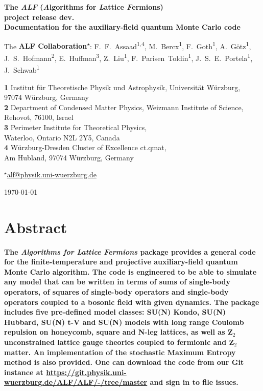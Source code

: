 \documentclass[submission, PhysCodeb]{SciPost}
\newcommand{\ALFver}{dev.}          %
\newcommand{\ALFbranch}{master}   %
\newcommand{\Ztwo}{\mathbf{Z}_{2}}
\begin{document}
	
\begin{center}{\Large \textbf{
The \emph{ALF} (\emph{A}lgorithms for \emph{L}attice \emph{F}ermions)\\project release \ALFver\\
{\normalsize Documentation for the  auxiliary-field quantum Monte Carlo code}
}}\end{center}

\begin{center}
The \textbf{ALF Collaboration\textsuperscript{$\star$}}:
F.~F.~Assaad\textsuperscript{1,4},
M.~Bercx\textsuperscript{1},
F.~Goth\textsuperscript{1},
A.~G\"otz\textsuperscript{1},
J.~S.~Hofmann\textsuperscript{2},
E.~Huffman\textsuperscript{3},
Z.~Liu\textsuperscript{1},
F.~Parisen~Toldin\textsuperscript{1},
J.~S.~E.~Portela\textsuperscript{1},
J.~Schwab\textsuperscript{1}
\end{center}

\begin{center}
{\bf 1} Institut f\"ur Theoretische Physik und Astrophysik, Universit\"at W\"urzburg,\\
97074 W\"urzburg, Germany\\
{\bf 2} Department of Condensed Matter Physics, Weizmann Institute of Science,\\
Rehovot, 76100, Israel\\
{\bf 3} Perimeter Institute for Theoretical Physics,\\
Waterloo, Ontario N2L 2Y5, Canada\\
{\bf 4} W\"urzburg-Dresden Cluster of Excellence ct.qmat, \\ Am Hubland, 97074 W\"urzburg, Germany

${}^\star$\href{mailto:alf@physik.uni-wuerzburg.de}{\small \sf alf@physik.uni-wuerzburg.de}
\end{center}

\begin{center}
\today
\end{center}


\section*{Abstract}
{\bf
The \emph{Algorithms for Lattice Fermions} package provides a general code for the finite-temperature and projective auxiliary-field quantum Monte Carlo algorithm. The code is engineered to be able to simulate any model that can be written in terms of sums of single-body operators, of squares of single-body operators and single-body operators coupled to a bosonic field with given dynamics.   The package includes five pre-defined model classes:  SU(N) Kondo, SU(N) Hubbard, SU(N) t-V and SU(N) models with long range Coulomb repulsion on honeycomb, square and N-leg lattices, as well as $\Ztwo$  unconstrained lattice gauge theories coupled to fermionic and $\Ztwo$ matter. An implementation of the stochastic  Maximum Entropy  method is also provided. 
One can download the code from our Git instance at \url{https://git.physik.uni-wuerzburg.de/ALF/ALF/-/tree/\ALFbranch} and sign in to file issues.} \\
\end{document}
